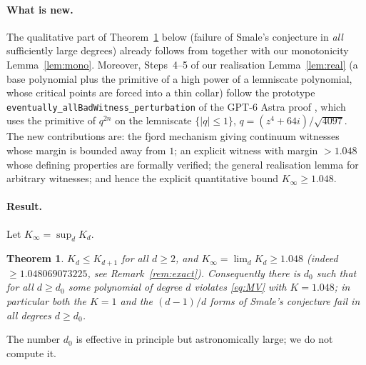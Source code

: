 \documentclass[11pt]{article}
\numberwithin{equation}{section}
\newtheorem{theorem}{Theorem}[section]
\theoremstyle{definition}
\theoremstyle{remark}
\begin{document}
\paragraph{What is new.} The qualitative part of Theorem~\ref{thm:main} below (failure of Smale's conjecture
in \emph{all} sufficiently large degrees) already follows from \cite{GPT6} together with our
monotonicity Lemma~\ref{lem:mono}. Moreover, Steps~4--5 of our realisation Lemma~\ref{lem:real} (a base
polynomial plus the primitive of a high power of a lemniscate polynomial, whose critical points are
forced into a thin collar) follow the prototype \texttt{eventually\_allBadWitness\_perturbation} of
the GPT-6 Astra proof \cite{GPT6}, which uses the primitive of $q^{2n}$ on the lemniscate
$\{|q|\le1\}$, $q=(z^4+64i)/\sqrt{4097}$. The new contributions are: the fjord mechanism giving
continuum witnesses whose margin is bounded away from $1$; an explicit witness with margin
$>1.048$ whose defining properties are formally verified; the general realisation lemma for arbitrary
witnesses; and hence the explicit quantitative bound $K_\infty\ge1.048$.

\paragraph{Result.} Let $K_\infty=\sup_d K_d$.
\begin{theorem}\label{thm:main}
$K_d\le K_{d+1}$ for all $d\ge2$, and $K_\infty=\lim_d K_d\ge 1.048$ (indeed
$\ge1.048069073225$, see Remark~\ref{rem:exact}). Consequently there is $d_0$ such that for all $d\ge d_0$ some polynomial of degree
$d$ violates \eqref{eq:MV} with $K=1.048$; in particular both the $K=1$ and the $(d-1)/d$ forms of
Smale's conjecture fail in all degrees $d\ge d_0$.
\end{theorem}
The number $d_0$ is effective in principle but astronomically large; we do not compute it.
\end{document}
